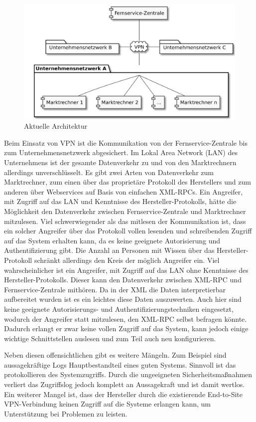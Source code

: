 \documentclass[11pt,a4paper]{report}
\begin{document}
\begin{figure}[htbp]
\centering
\includegraphics[scale=0.2]{images/problemfeld.pdf}
\caption{Aktuelle Architektur}
\label{fig:current_setup}
\end{figure}

Beim Einsatz von VPN ist die Kommunikation von der Fernservice-Zentrale bis zum Unternehmensnetzwerk abgesichert. Im Lokal Area Network (LAN) des Unternehmens ist der gesamte Datenverkehr zu und von den Marktrechnern allerdings unverschlüsselt. Es gibt zwei Arten von Datenverkehr zum Marktrechner, zum einen über das proprietäre Protokoll des Herstellers und zum anderen über Webservices auf Basis von einfachen XML-RPCs. Ein Angreifer, mit Zugriff auf das LAN und Kenntnisse des Hersteller-Protokolls, hätte die Möglichkeit den Datenverkehr zwischen Fernservice-Zentrale und Marktrechner mitzulesen. Viel schwerwiegender als das mitlesen der Kommunikation ist, dass ein solcher Angreifer über das Protokoll vollen lesenden und schreibenden Zugriff auf das System erhalten kann, da es keine geeignete Autorisierung und Authentifizierung gibt. Die Anzahl an Personen mit Wissen über das Hersteller-Protokoll schränkt allerdings den Kreis der möglich Angreifer ein. Viel wahrscheinlicher ist ein Angreifer, mit Zugriff auf das LAN ohne Kenntnisse des Hersteller-Protokolls. Dieser kann den Datenverkehr zwischen XML-RPC und Fernservice-Zentrale mithören. Da in der XML die Daten interpretierbar aufbereitet wurden ist es ein leichtes diese Daten auszuwerten. Auch hier sind keine geeignete Autorisierungs- und Authentifizierungstechniken eingesetzt, wodurch der Angreifer statt mitzulesen, den XML-RPC selbst befragen könnte. Dadurch erlangt er zwar keine vollen Zugriff auf das System, kann jedoch einige wichtige Schnittstellen auslesen und zum Teil auch neu konfigurieren. 

Neben diesen offensichtlichen gibt es weitere Mängeln. Zum Beispiel sind aussagekräftige Logs Hauptbestandteil eines guten Systems. Sinnvoll ist das protokollieren des Systemzugriffs. Durch die ungeeigneten Sicherheitsmaßnahmen verliert das Zugriffslog jedoch komplett an Aussagekraft und ist damit wertlos. Ein weiterer Mangel ist, dass der Hersteller durch die existierende End-to-Site VPN-Verbindung keinen Zugriff auf die Systeme erlangen kann, um Unterstützung bei Problemen zu leisten. 
\end{document}
